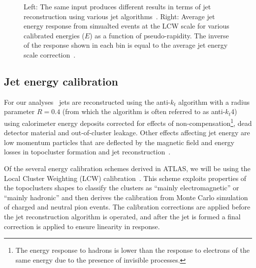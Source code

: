 \begin{figure}[tb]\begin{center}
        \caption{Left: The same input produces different results in terms of jet reconstruction using 
        various jet algorithms~\cite{Salam:2009jx}. Right: Average jet energy response from simualted events
        at the LCW scale for various calibrated energies ($E$) as a function of
        pseudo-rapidity. The inverse of the response shown 
        in each bin is equal to the average jet energy scale correction~\cite{jes}.}
\end{center}\end{figure}


\tocless\subsection{Jet energy calibration}
For our analyses~\cite{topcommon2013} jets are reconstructed using the anti-$k_t$
algorithm with a radius parameter $R=0.4$ (from which the algorithm is often referred to as anti-$k_t$4) 
using calorimeter energy deposits corrected for effects of non-compensation\footnote{The energy response 
to hadrons is lower than the response to electrons of the same energy due to the presence of invisible processes.},
dead detector material and out-of-cluster leakage.
Other effects affecting jet energy are low momentum particles
that are deflected by the magnetic field and energy losses in 
topocluster formation and jet reconstruction~\cite{jes}. 

Of the several energy calibration schemes derived in ATLAS, we will be using the 
Local Cluster Weighting (LCW) calibration~\cite{LCW1,LCW2}.
This scheme exploits properties of the topoclusters shapes 
to classify the clusters as ``mainly electromagnetic'' or
``mainly hadronic'' and then derives the calibration from Monte Carlo simulation
of charged and neutral pion events. The calibration corrections are applied
before the jet reconstruction algorithm is operated, and after the jet is
formed a final correction is applied to ensure linearity in response. 

